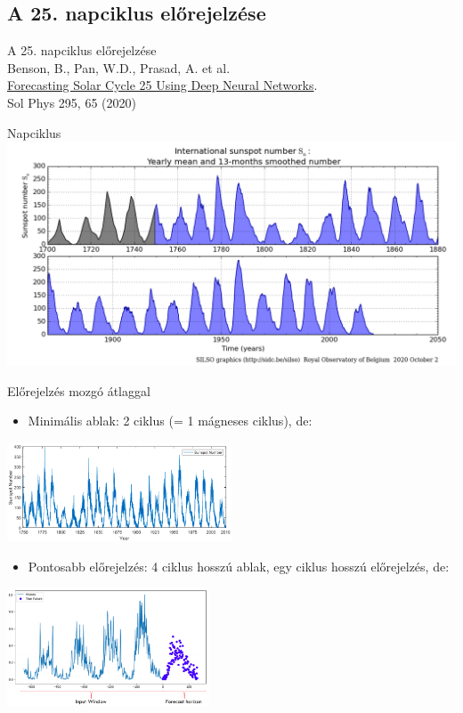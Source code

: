 \subsection{A 25. napciklus előrejelzése}

\begin{frame}{}
    \centering
    \Huge{A 25. napciklus előrejelzése}\\
    \vspace*{1cm}
    \large{Benson, B., Pan, W.D., Prasad, A. et al. \\ \href{https://arxiv.org/pdf/2005.12406.pdf}{Forecasting Solar Cycle 25 Using Deep Neural Networks}. \\ Sol Phys 295, 65 (2020)}
\end{frame}

\begin{frame}{Napciklus}
    \centering
    \includegraphics[width=1.0\textwidth]{figures/sunspot_number.png}
\end{frame}

\begin{frame}{Előrejelzés mozgó átlaggal}
    \begin{itemize}
        \item Minimális ablak: 2 ciklus (= 1 mágneses ciklus), de:
    \end{itemize}
    \centering
    \includegraphics[width=0.5\textwidth]{figures/solar_cycle_zoom.png}
    
    \pause
    \begin{itemize}
        \item Pontosabb előrejelzés: 4 ciklus hosszú ablak, egy ciklus hosszú előrejelzés, de:
    \end{itemize}
    \centering
    \includegraphics[width=0.45\textwidth]{figures/solar_cycle_moving_avg.png}
\end{frame}


